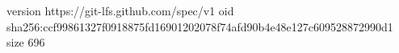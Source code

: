 version https://git-lfs.github.com/spec/v1
oid sha256:ccf99861327f0918875fd16901202078f74afd90b4e48e127c609528872990d1
size 696
